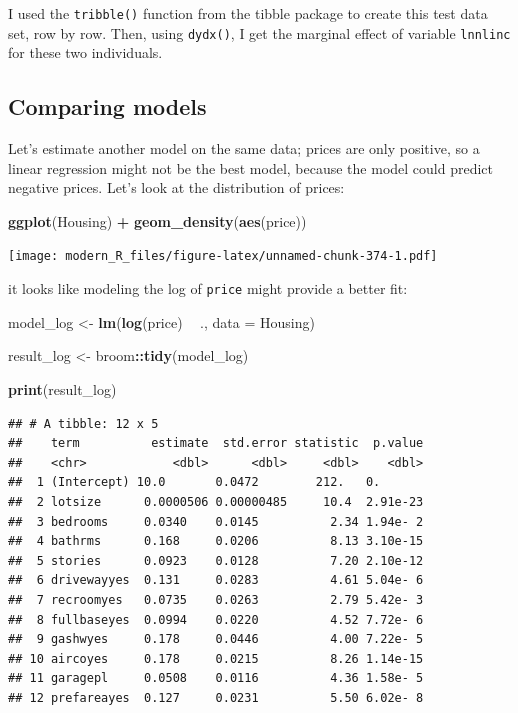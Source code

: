 \documentclass[]{gitbook}
\newenvironment{Shaded}{\begin{snugshade}}{\end{snugshade}}
\newcommand{\DataTypeTok}[1]{\textcolor[rgb]{0.13,0.29,0.53}{#1}}
\newcommand{\KeywordTok}[1]{\textcolor[rgb]{0.13,0.29,0.53}{\textbf{#1}}}
\newcommand{\NormalTok}[1]{#1}
\newcommand{\OperatorTok}[1]{\textcolor[rgb]{0.81,0.36,0.00}{\textbf{#1}}}
\newcommand{\StringTok}[1]{\textcolor[rgb]{0.31,0.60,0.02}{#1}}
\theoremstyle{definition}
\theoremstyle{definition}
\theoremstyle{definition}
\theoremstyle{remark}
\begin{document}
I used the \texttt{tribble()} function from the tibble package to create
this test data set, row by row. Then, using \texttt{dydx()}, I get the
marginal effect of variable \texttt{lnnlinc} for these two individuals.

\hypertarget{comparing-models}{%
\subsection{Comparing models}\label{comparing-models}}

Let's estimate another model on the same data; prices are only positive,
so a linear regression might not be the best model, because the model
could predict negative prices. Let's look at the distribution of prices:

\begin{Shaded}
\begin{Highlighting}[]
\KeywordTok{ggplot}\NormalTok{(Housing) }\OperatorTok{+}
\StringTok{  }\KeywordTok{geom_density}\NormalTok{(}\KeywordTok{aes}\NormalTok{(price))}
\end{Highlighting}
\end{Shaded}

\texttt{[image: modern\_R\_files/figure-latex/unnamed-chunk-374-1.pdf]}

it looks like modeling the log of \texttt{price} might provide a better
fit:

\begin{Shaded}
\begin{Highlighting}[]
\NormalTok{model_log <-}\StringTok{ }\KeywordTok{lm}\NormalTok{(}\KeywordTok{log}\NormalTok{(price) }\OperatorTok{~}\StringTok{ }\NormalTok{., }\DataTypeTok{data =}\NormalTok{ Housing)}

\NormalTok{result_log <-}\StringTok{ }\NormalTok{broom}\OperatorTok{::}\KeywordTok{tidy}\NormalTok{(model_log)}

\KeywordTok{print}\NormalTok{(result_log)}
\end{Highlighting}
\end{Shaded}

\begin{verbatim}
## # A tibble: 12 x 5
##    term          estimate  std.error statistic  p.value
##    <chr>            <dbl>      <dbl>     <dbl>    <dbl>
##  1 (Intercept) 10.0       0.0472        212.   0.      
##  2 lotsize      0.0000506 0.00000485     10.4  2.91e-23
##  3 bedrooms     0.0340    0.0145          2.34 1.94e- 2
##  4 bathrms      0.168     0.0206          8.13 3.10e-15
##  5 stories      0.0923    0.0128          7.20 2.10e-12
##  6 drivewayyes  0.131     0.0283          4.61 5.04e- 6
##  7 recroomyes   0.0735    0.0263          2.79 5.42e- 3
##  8 fullbaseyes  0.0994    0.0220          4.52 7.72e- 6
##  9 gashwyes     0.178     0.0446          4.00 7.22e- 5
## 10 aircoyes     0.178     0.0215          8.26 1.14e-15
## 11 garagepl     0.0508    0.0116          4.36 1.58e- 5
## 12 prefareayes  0.127     0.0231          5.50 6.02e- 8
\end{verbatim}
\end{document}
